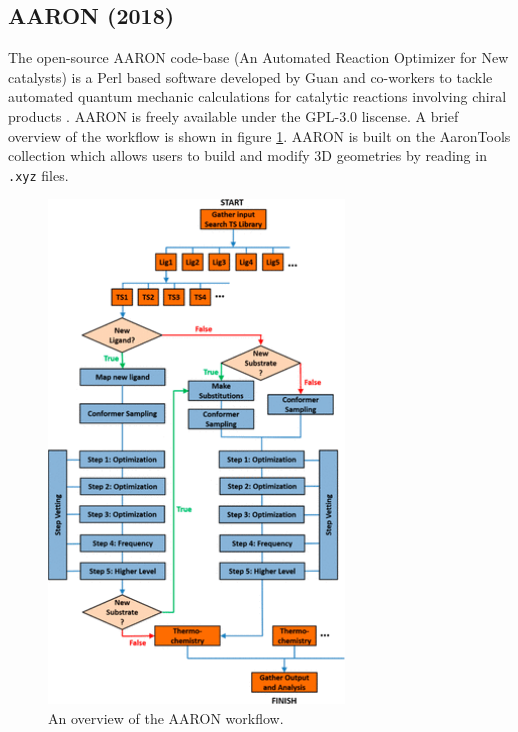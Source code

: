 \documentclass[preprint, 11pt]{elsarticle} %
\begin{document}

\subsection{AARON (2018)}

The open-source AARON code-base (An Automated Reaction Optimizer for New catalysts) is a Perl based software developed by Guan and co-workers to tackle automated quantum mechanic calculations for catalytic reactions involving chiral products \cite{Guan:2018}. 
AARON is freely available under the GPL-3.0 liscense.
A brief overview of the workflow is shown in figure \ref{fig:aaron_workflow}.
AARON is built on the AaronTools \cite{aarontools:2018} collection which allows users to build and modify 3D geometries by reading in \texttt{.xyz} files.

\begin{figure}
    \centering
    \includegraphics[width=0.7\textwidth]{aaron_workflow.png}
    \caption{An overview of the AARON workflow.}
    \label{fig:aaron_workflow}
\end{figure}
\end{document}
